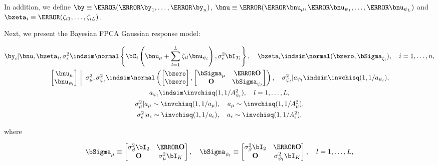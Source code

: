 \documentclass[ba]{imsart}
\numberwithin{equation}{section}
\theoremstyle{plain}
\def\sigsqeps{\sigma^2_{\epsilon}}
\def\sigsqbeta{\sigma^2_\beta}
\def\aeps{a_{\epsilon}}
\def\Asqeps{A_{\epsilon}^2}
\def\sigsqmu{\sigma^2_{\mu}}
\def\amu{a_{\mu}}
\def\Asqmu{A_{\mu}^2}
\def\numu{\bnu_\mu}
\newcommand\nupsi[1]{\bnu_{\psi_{#1}}}
\newcommand\sigsqpsi[1]{\sigma^2_{\psi_{#1}}}
\newcommand\apsi[1]{a_{\psi_{#1}}}
\newcommand\Asqpsi[1]{A_{\psi_{#1}}^2}
\begin{document}
\noindent In addition, we define $\by \equiv \T{(\T{\by_1}, \dots, \T{\by_n})}$, $\bnu \equiv \T{(\T{\numu}, \T{\nupsi{1}},
\dots, \T{\nupsi{L}})}$ and $\bzeta_i \equiv \T{(\zeta_{i1}, \dots, \zeta_{iL})}$.

Next, we present the Bayesian FPCA Gaussian response model:

\begin{equation}
\begin{gathered}
	\by_i | \bnu, \bzeta_i, \sigsqeps \indsim \normal \left\{
		\bC_i \left( \numu + \sum_{l=1}^L \zeta_{il} \nupsi{l} \right), \sigsqeps \bI_{T_i}
	\right\}, \quad
	\bzeta_i \indsim \normal (\bzero, \bSigma_{\zeta_i}), \quad
	i = 1, \dots, n, \\
	$$
	\left.\begin{bmatrix}
		\numu \\
		\nupsi{l}
	\end{bmatrix} \ \right| \ \sigsqmu, \sigsqpsi{l}
		\indsim
			\normal \left(
				\begin{bmatrix}
					\bzero \\
					\bzero \\
				\end{bmatrix},
				\begin{bmatrix}
					\bSigma_\mu & \T{\textbf{O}} \\
					\textbf{O} & \bSigma_{\psi_l}
				\end{bmatrix}
			\right), \quad
	\sigsqpsi{l} | \apsi{l} \indsim \invchisq (1, 1/\apsi{l}), \\
	$$
	\apsi{l} \indsim \invchisq (1, 1/\Asqpsi{l}), \quad l = 1, \dots, L, \\
	$$
	\sigsqmu | \amu \sim \invchisq (1, 1/\amu), \quad \amu \sim \invchisq(1, 1/\Asqmu), \\
	$$
	\sigsqeps | \aeps \sim \invchisq (1, 1/\aeps), \quad \aeps \sim \invchisq(1, 1/\Asqeps),
\end{gathered}
\label{bayes_fpca_mod}
\end{equation}

\noindent where

\begin{equation}
	\bSigma_\mu \equiv \begin{bmatrix}
		\sigsqbeta \bI_2 & \T{\textbf{O}} \\
		\textbf{O} & \sigsqmu \bI_{K}
	\end{bmatrix}, \quad
	\bSigma_{\psi_l} \equiv \begin{bmatrix}
		\sigsqbeta \bI_2 & \T{\textbf{O}} \\
		\textbf{O} & \sigsqpsi{l} \bI_{K}
	\end{bmatrix}, \quad l = 1, \dots, L,
\label{sub_vecs_mats}
\end{equation}
\end{document}
